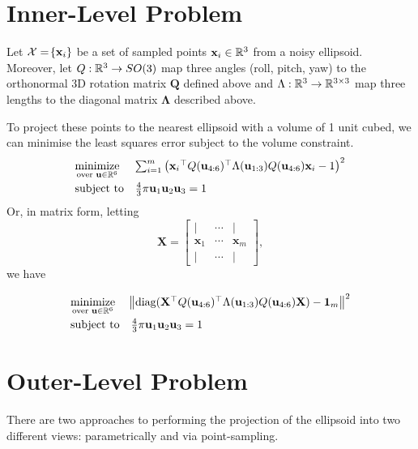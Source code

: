\documentclass{article}
\begin{document}
\section{Inner-Level Problem}
Let $\mathcal{X} = \!\left\{ \mathbf x_i \right\}$ be a set of sampled points $\mathbf x_i \in \mathbb{R}^3$ from a noisy ellipsoid. Moreover, let $Q: \mathbb{R}^3 \to SO(3)$ map three angles (roll, pitch, yaw) to the orthonormal 3D rotation matrix $\mathbf Q$ defined above and $\Lambda: \mathbb{R}^3 \to \mathbb{R}^{3\times 3}$ map three lengths to the diagonal matrix $\mathbf \Lambda$ described above.

To project these points to the nearest ellipsoid with a volume of 1 unit cubed, we can minimise the least squares error subject to the volume constraint.
\begin{equation}
    \begin{array}{ll}
        \underset{\text {over } \mathbf u\in \mathbb{R}^6}{\text{minimize}} & \sum_{i=1}^{m} \left({\mathbf x_i}^\top Q(\mathbf u_{4:6}) ^\top \Lambda(\mathbf u_{1:3}) Q(\mathbf u_{4:6}) \mathbf x_i - 1\right)^2 \\[0.8em]
        \text{subject to} & \frac{4}{3} \pi \mathbf u_1 \mathbf u_2 \mathbf u_3 = 1
      \end{array}          
\end{equation}
Or, in matrix form, letting $$\mathbf X = \begin{bmatrix}
    | & \cdots & | \\
    \mathbf x_1 & \cdots & \mathbf x_m \\
    | & \cdots & |
  \end{bmatrix},$$
  we have

\begin{equation}
    \begin{array}{ll}
        \underset{\text {over } \mathbf u\in \mathbb{R}^6}{\text{minimize}} & \!\left\Vert \text{diag}(\mathbf X^\top Q(\mathbf u_{4:6}) ^\top \Lambda(\mathbf u_{1:3}) Q(\mathbf u_{4:6}) \mathbf X) - \mathbf 1_m \right\Vert ^2 \\[0.8em]
        \text{subject to} & \frac{4}{3} \pi \mathbf u_1 \mathbf u_2 \mathbf u_3 = 1
      \end{array}          
\end{equation}

\section{Outer-Level Problem}
There are two approaches to performing the projection of the ellipsoid into two different views: parametrically and via point-sampling.
\end{document}
